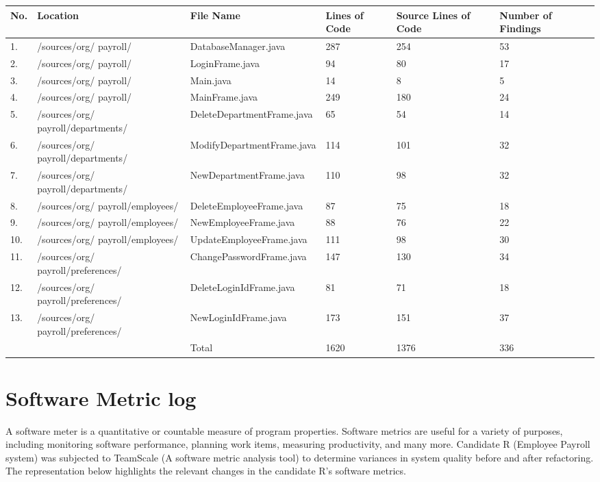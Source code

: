 \documentclass[12pt,english]{article}
\begin{document}
\begin{table}[!ht]
    \begin{tabularx}{1.0\textwidth}{|l|m{8em}|m{5.5cm}|m{1cm}|m{1.1cm}|m{3.1em}|}
    \hline
         No. & Location & File Name & Lines of Code & Source Lines of Code & Number of Findings \\ \hline
         1. & /sources/org/ payroll/ & DatabaseManager.java & 287 & 254 & 53 \\ \hline
         2. & /sources/org/ payroll/ & LoginFrame.java & 94 & 80 & 17 \\ \hline
         3. & /sources/org/ payroll/ & Main.java & 14 & 8 & 5 \\ \hline
         4. & /sources/org/ payroll/ & MainFrame.java & 249 & 180 & 24 \\ \hline
         5. & /sources/org/ payroll/departments/ & DeleteDepartmentFrame.java & 65 & 54 & 14 \\ \hline
         6. & /sources/org/ payroll/departments/ & ModifyDepartmentFrame.java & 114 & 101 & 32 \\ \hline
         7. & /sources/org/ payroll/departments/ & NewDepartmentFrame.java & 110 & 98 & 32 \\ \hline
         8. & /sources/org/ payroll/employees/ & DeleteEmployeeFrame.java & 87 & 75 & 18 \\ \hline
         9. & /sources/org/ payroll/employees/ & NewEmployeeFrame.java & 88 & 76 & 22 \\ \hline
         10. & /sources/org/ payroll/employees/ & UpdateEmployeeFrame.java & 111 & 98 & 30 \\ \hline
         11. & /sources/org/ payroll/preferences/ & ChangePasswordFrame.java & 147 & 130 & 34 \\ \hline
         12. & /sources/org/ payroll/preferences/ & DeleteLoginIdFrame.java & 81 & 71 & 18 \\ \hline
         13. & /sources/org/ payroll/preferences/ & NewLoginIdFrame.java & 173 & 151 & 37 \\ \hline
         \multicolumn{2}{|l}{} & Total & 1620 & 1376 & 336 \\ \hline
    \end{tabularx}
\end{table}

\newpage
\section{ Software Metric log}
A software meter is a quantitative or countable measure of program properties. Software metrics are useful for a variety of purposes, including monitoring software performance, planning work items, measuring productivity, and many more.
Candidate R (Employee Payroll system) was subjected to TeamScale (A software metric analysis tool) to determine variances in system quality before and after refactoring. The representation below highlights the relevant changes in the candidate R's software metrics.\\
\end{document}
